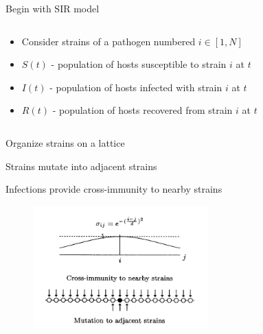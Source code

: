 \documentclass{beamer}
\begin{document}
\begin{frame}{Begin with SIR model}
    \begin{columns}       
         \begin{column}{0.5\textwidth}
        \begin{itemize}
            \item Consider strains of a pathogen numbered $i \in [1,N]$ 
            \item $S(t)$ - population of hosts susceptible to strain $i$ at $t$
            \item $I(t)$ - population of hosts infected with strain $i$ at $t$
            \item $R(t)$ - population of hosts recovered from strain $i$ at $t$
        \end{itemize} 
    \end{column}
        \begin{column}{0.5\textwidth}
            \begin{figure}
                \centering
                \scalebox{1.0}{
                
                }
            \end{figure}
        \end{column}
        \end{columns}
\end{frame}
\begin{frame}{Organize strains on a lattice}
    \begin{figure}
        \centering
        \scalebox{0.8}{
        
        }
    \end{figure}
\end{frame}
\begin{frame}{Strains mutate into adjacent strains}
    \begin{figure}
        \centering
        \scalebox{0.8}{
        
        }
    \end{figure}
\end{frame}
\begin{frame}{Infections provide cross-immunity to nearby strains}
        \centering
            \begin{figure}
                \includegraphics[width=0.6\textwidth]{standalone/gog_fig.png}
            \end{figure}
    \centering
    \vfill
    \tiny{\cite{gogDynamicsSelectionManystrain2002}}
\end{frame}
\end{document}
